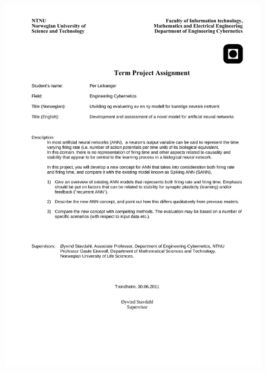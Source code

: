\documentclass[b5paper,11 pt]{report}
\begin{document}
\begin{figure}[h!tbp]
        \centering
        \includegraphics[width=\textwidth]{PerLeikanger-Oppgavetekst-engelsk.pdf}
\end{figure}


\end{document}
